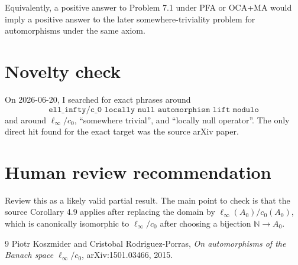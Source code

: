 \documentclass[11pt]{article}
\newcommand{\N}{\mathbb N}
\newcommand{\X}{\ell_\infty/c_0}
\begin{document}
Equivalently, a positive answer to Problem 7.1 under PFA or OCA+MA would imply
a positive answer to the later somewhere-triviality problem for automorphisms
under the same axiom.

\section*{Novelty check}

On 2026-06-20, I searched for exact phrases around
\[
\texttt{ell\_infty/c\_0 locally null automorphism lift modulo}
\]
and around \(\X\), ``somewhere trivial'', and ``locally null operator''.
The only direct hit found for the exact target was the source arXiv paper.

\section*{Human review recommendation}

Review this as a likely valid partial result.  The main point to check is that
the source Corollary 4.9 applies after replacing the domain by
\(\ell_\infty(A_0)/c_0(A_0)\), which is canonically isomorphic to \(\X\) after
choosing a bijection \(\N\to A_0\).

\begin{thebibliography}{9}
Piotr Koszmider and Cristobal Rodriguez-Porras,
\emph{On automorphisms of the Banach space \(\ell_\infty/c_0\)},
arXiv:1501.03466, 2015.
\end{thebibliography}
\end{document}
